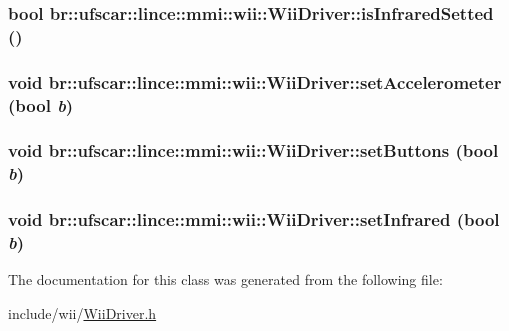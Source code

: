 \label{classbr_1_1ufscar_1_1lince_1_1mmi_1_1wii_1_1WiiDriver_ad1fb0372f607385c3b20391eb005212d}
\hypertarget{classbr_1_1ufscar_1_1lince_1_1mmi_1_1wii_1_1WiiDriver_a419b13cbd01d04d9399287ce643c7b04}{
\subsubsection[{isInfraredSetted}]{\setlength{\rightskip}{0pt plus 5cm}bool br::ufscar::lince::mmi::wii::WiiDriver::isInfraredSetted ()}}
\label{classbr_1_1ufscar_1_1lince_1_1mmi_1_1wii_1_1WiiDriver_a419b13cbd01d04d9399287ce643c7b04}
\hypertarget{classbr_1_1ufscar_1_1lince_1_1mmi_1_1wii_1_1WiiDriver_a98c084d2c015c259c252e72958afc986}{
\subsubsection[{setAccelerometer}]{\setlength{\rightskip}{0pt plus 5cm}void br::ufscar::lince::mmi::wii::WiiDriver::setAccelerometer (bool {\em b})}}
\label{classbr_1_1ufscar_1_1lince_1_1mmi_1_1wii_1_1WiiDriver_a98c084d2c015c259c252e72958afc986}
\hypertarget{classbr_1_1ufscar_1_1lince_1_1mmi_1_1wii_1_1WiiDriver_a24c5e0a9b6067419be8c08e8519b698f}{
\subsubsection[{setButtons}]{\setlength{\rightskip}{0pt plus 5cm}void br::ufscar::lince::mmi::wii::WiiDriver::setButtons (bool {\em b})}}
\label{classbr_1_1ufscar_1_1lince_1_1mmi_1_1wii_1_1WiiDriver_a24c5e0a9b6067419be8c08e8519b698f}
\hypertarget{classbr_1_1ufscar_1_1lince_1_1mmi_1_1wii_1_1WiiDriver_a71196f296c892a1d8874da0d8eef9734}{
\subsubsection[{setInfrared}]{\setlength{\rightskip}{0pt plus 5cm}void br::ufscar::lince::mmi::wii::WiiDriver::setInfrared (bool {\em b})}}
\label{classbr_1_1ufscar_1_1lince_1_1mmi_1_1wii_1_1WiiDriver_a71196f296c892a1d8874da0d8eef9734}


The documentation for this class was generated from the following file:\begin{DoxyCompactItemize}
\item 
include/wii/\hyperlink{WiiDriver_8h}{WiiDriver.h}\end{DoxyCompactItemize}

